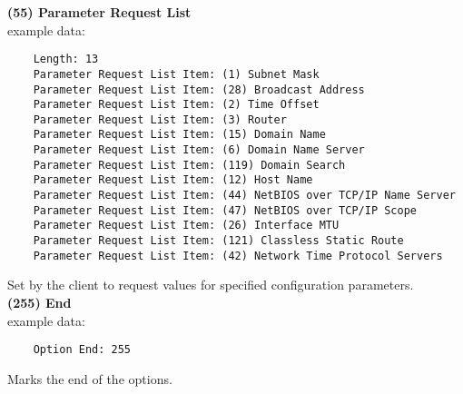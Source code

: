     
\textbf{(55) Parameter Request List} \\
    example data:
    \begin{lstlisting}
    Length: 13
    Parameter Request List Item: (1) Subnet Mask
    Parameter Request List Item: (28) Broadcast Address
    Parameter Request List Item: (2) Time Offset
    Parameter Request List Item: (3) Router
    Parameter Request List Item: (15) Domain Name
    Parameter Request List Item: (6) Domain Name Server
    Parameter Request List Item: (119) Domain Search
    Parameter Request List Item: (12) Host Name
    Parameter Request List Item: (44) NetBIOS over TCP/IP Name Server
    Parameter Request List Item: (47) NetBIOS over TCP/IP Scope
    Parameter Request List Item: (26) Interface MTU
    Parameter Request List Item: (121) Classless Static Route
    Parameter Request List Item: (42) Network Time Protocol Servers
    \end{lstlisting}
    Set by the client to request values for specified configuration parameters. \\
    
\textbf{(255) End} \\
    example data:
    \begin{lstlisting}
    Option End: 255 
    \end{lstlisting}
    Marks the end of the options.\\
    

